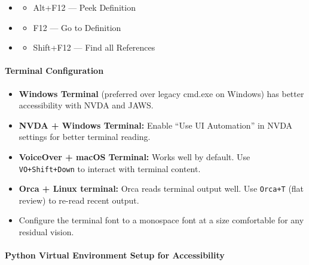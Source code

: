 \documentclass[
  justified,
  openright,
]{tufte-book}
\let\subsection\paragraph
\let\paragraph\paragraph
\let\subsection\paragraph
\let\paragraph\paragraph
\providecommand{\tightlist}{%
  \setlength{\itemsep}{0pt}\setlength{\parskip}{0pt}}
\begin{document}
\begin{itemize}
  \begin{itemize}
  \tightlist
  \item[$\square$]
    Ctrl+Shift+O --- Go to symbol (function/class navigation)
  \end{itemize}
\item
  \begin{itemize}
  \tightlist
  \item[$\square$]
    Alt+F12 --- Peek Definition
  \end{itemize}
\item
  \begin{itemize}
  \tightlist
  \item[$\square$]
    F12 --- Go to Definition
  \end{itemize}
\item
  \begin{itemize}
  \tightlist
  \item[$\square$]
    Shift+F12 --- Find all References
  \end{itemize}
\end{itemize}

\subsection{Terminal Configuration}\label{terminal-configuration}

\begin{itemize}
\tightlist
\item
  \textbf{Windows Terminal} (preferred over legacy cmd.exe on Windows)
  has better accessibility with NVDA and JAWS.
\item
  \textbf{NVDA + Windows Terminal:} Enable ``Use UI Automation'' in NVDA
  settings for better terminal reading.
\item
  \textbf{VoiceOver + macOS Terminal:} Works well by default. Use
  \texttt{VO+Shift+Down} to interact with terminal content.
\item
  \textbf{Orca + Linux terminal:} Orca reads terminal output well. Use
  \texttt{Orca+T} (flat review) to re-read recent output.
\item
  Configure the terminal font to a monospace font at a size comfortable
  for any residual vision.
\end{itemize}

\subsection{Python Virtual Environment Setup for
Accessibility}\label{python-virtual-environment-setup-for-accessibility}
\end{document}
